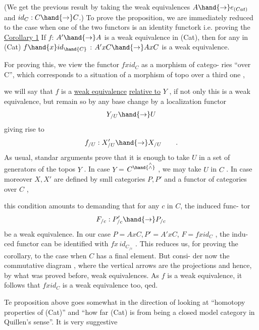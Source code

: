 
(We get the previous result by taking the weak equivalences $A\hand{\to} e_{(Cat)}$
and $id_C : C \hand{\to} C$.)  To prove the proposition,  we are immediately reduced
to the case when one of the two functors is  an identity functork  i.e.
proving the
\uline{Corollary 1}  If  $f$:  $A'\hand{\to} A$ is a weak equivalence in (Cat),  then for any
 in (Cat)  $f\hand{x}id_{\hand{C}}$ : $A'xC \hand{\to} AxC$  is a weak equivalence.

For proving this,  we view the functor $fxid_C$  as a morphism of catego-%
ries ``over C'',  which corresponds to a situation of a morphism of topo
over a third one
\qquad ,

we will say that $f$ is a \uline{weak equivalence} \uline{relative to} $Y$ ,  if not only this
is a weak equivalence,  but remain so by any base change by a localization
functor
\[ Y_{/U} \hand{\to} U \]
giving rise to
\[ f_{/U} : X'_{/U} \hand{\to} X_{/U} \qquad . \]
As usual,  standar arguments prove that it is enough to take $U$ in a set
of generators of the topos $Y$ .  In case $Y$ =  $C^{\hand{\overset{\wedge}{\wedge}}}$ ,  we may take $U$ in $C$ .
In case moreover  $X,X'$ are defined by smll categories $P,P'$ and a functor
of categories over $C$
\qquad ,

this condition amounts to demanding that for any $c$ in $C$,  the induced func-%
tor
\[ F_{/c} : P'_{/c} \hand{\to} P_{/c} \]
be a weak equivalence.  In our case $P=AxC,P'=A'xC$, $F = fxid_C$ ,  the indu-%
ced functor can be identified with  $fx\,id_{C_{/c}}$  .  This reduces us,  for
proving the corollary, to the case when $C$ has a final element.  But consi-%
der now the commutative diagram
\qquad ,
where the vertical arrows are the projections and hence,  by what was
proved before,  weak equivalences.  As $f$ is a weak equivalence,  it follows
that $fxid_C$ is a weak equivalence too,  qed.

Te proposition above goes somewhat in the direction of looking at
``homotopy properties of (Cat)''   and ``how far (Cat) is from being a
closed model category in Quillen's sense''.  It is very suggestive 
